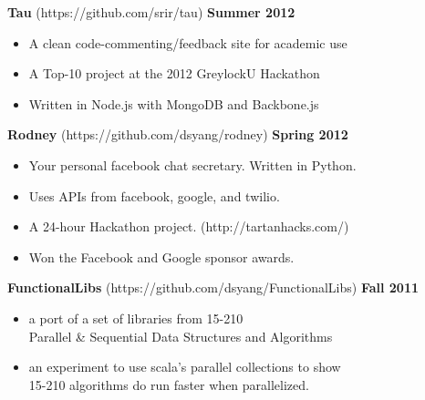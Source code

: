 \documentclass[sectioned]{dsyangres}
\begin{document}
\begin{resume}
\textbf{Tau} (https://github.com/srir/tau)
\hfill \textbf{Summer 2012}
  \begin{itemize} \itemsep -2pt
    \item A clean code-commenting/feedback site for academic use
    \item A Top-10 project at the 2012 GreylockU Hackathon
    \item Written in Node.js with MongoDB and Backbone.js
  \end{itemize}

\textbf{Rodney} (https://github.com/dsyang/rodney)
\hfill \textbf{Spring 2012}
  \begin{itemize} \itemsep -2pt
    \item Your personal facebook chat secretary. Written in Python.
    \item Uses APIs from facebook, google, and twilio.
    \item A 24-hour Hackathon project. (http://tartanhacks.com/)
    \item Won the Facebook and Google sponsor awards.
  \end{itemize}

\textbf{FunctionalLibs} (https://github.com/dsyang/FunctionalLibs)
\hfill \textbf{Fall 2011}
  \begin{itemize} \itemsep -2pt
    \item a port of a set of libraries from 15-210 \\
      Parallel \& Sequential Data Structures and Algorithms
    \item an experiment to use scala's parallel collections to show \\
      15-210 algorithms do run faster when parallelized.
  \end{itemize}




\end{resume}
\end{document}
